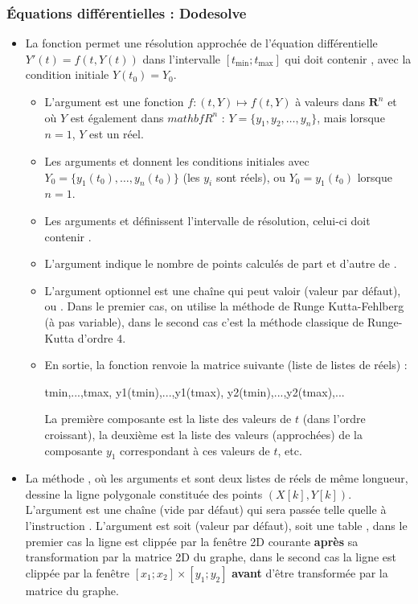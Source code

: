 \subsubsection{Équations différentielles : Dodesolve}

\begin{itemize}
\item La fonction  permet une résolution approchée de l'équation différentielle \(Y'(t)=f(t,Y(t))\) dans l'intervalle $[t_{\mathrm{min}};t_{\mathrm{max}}]$ qui doit contenir , avec la condition initiale $Y(t_0)=Y_0$.

\begin{itemize}
  \item L'argument  est une fonction \(f\colon (t,Y) \mapsto f(t,Y)\) à valeurs dans \(\mathbf R^n\) et où $Y$ est également dans \(mathbf R^n\) : $Y=\{y_1, y_2,\ldots, y_n\}$, mais lorsque $n=1$, $Y$ est un réel.
  \item Les arguments  et  donnent les conditions initiales avec $Y_0=\{y_1(t_0), \ldots, y_n(t_0)\}$ (les $y_i$ sont réels), ou $Y_0=y_1(t_0)$ lorsque $n=1$.
  \item Les arguments  et  définissent l'intervalle de résolution, celui-ci doit contenir .
  \item L'argument  indique le nombre de points calculés de part et d'autre de .
  \item L'argument optionnel  est une chaîne qui peut valoir  (valeur par défaut), ou . Dans le premier cas, on utilise la méthode de Runge Kutta-Fehlberg (à pas variable), dans le second cas c'est la méthode classique de Runge-Kutta d'ordre $4$.
  \item En sortie, la fonction renvoie la matrice suivante (liste de listes de réels) :
  
\begin{TeXcode}
{ {tmin,...,tmax}, {y1(tmin),...,y1(tmax)}, {y2(tmin),...,y2(tmax)},...}
\end{TeXcode}

  La première composante est la liste des valeurs de $t$ (dans l'ordre croissant), la deuxième est la liste des valeurs (approchées) de la composante $y_1$ correspondant à ces valeurs de $t$, etc.
    \end{itemize}
    
\item La méthode , où les arguments  et  sont deux listes de réels de même longueur, dessine la ligne polygonale constituée des points $(X[k],Y[k])$. L'argument  est une chaîne (vide par défaut) qui sera passée telle quelle à l'instruction \drawcmd. L'argument  est soit \nil (valeur par défaut), soit une table , dans le premier cas la ligne est clippée par la fenêtre 2D courante \textbf{après} sa transformation par la matrice 2D du graphe, dans le second cas la ligne est clippée par la fenêtre $[x_1;x_2]\times[y_1;y_2]$ \textbf{avant} d'être transformée par la matrice du graphe.



\end{itemize}
